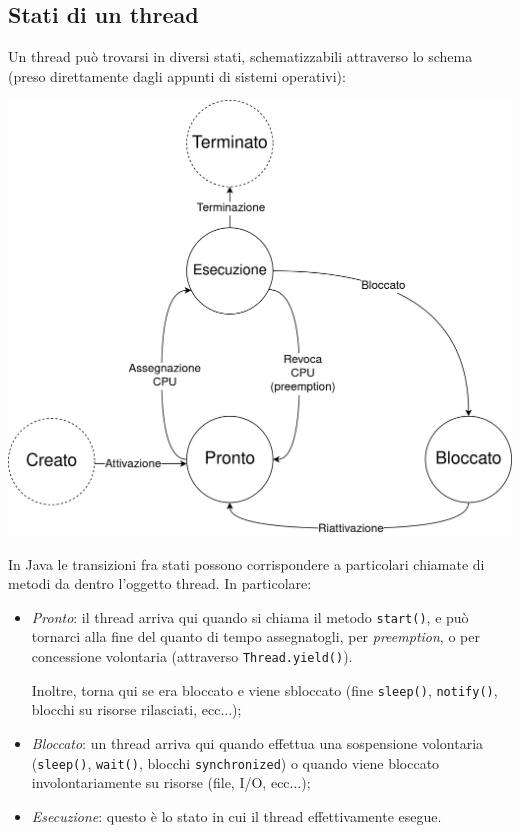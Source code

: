 \documentclass[a4paper,11pt]{article}
\begin{document}
\subsection{Stati di un thread}
Un thread può trovarsi in diversi stati, schematizzabili attraverso lo schema (preso direttamente dagli appunti di sistemi operativi):
\begin{center}
	\includegraphics[scale=0.25]{../figures/thread_stati.png}
\end{center}

In Java le transizioni fra stati possono corrispondere a particolari chiamate di metodi da dentro l'oggetto thread.
In particolare:
\begin{itemize}
	\item \textit{Pronto}: il thread arriva qui quando si chiama il metodo \lstinline|start()|, e può tornarci alla fine del quanto di tempo assegnatogli, per \textit{preemption}, o per concessione volontaria (attraverso \lstinline|Thread.yield()|).

		Inoltre, torna qui se era bloccato e viene sbloccato (fine \lstinline|sleep()|, \lstinline|notify()|, blocchi su risorse rilasciati, ecc...);
	\item \textit{Bloccato}: un thread arriva qui quando effettua una sospensione volontaria (\lstinline|sleep()|, \lstinline|wait()|, blocchi \lstinline|synchronized|) o quando viene bloccato involontariamente su risorse (file, I/O, ecc...);
	\item \textit{Esecuzione}: questo è lo stato in cui il thread effettivamente esegue.
\end{itemize}
\end{document}
